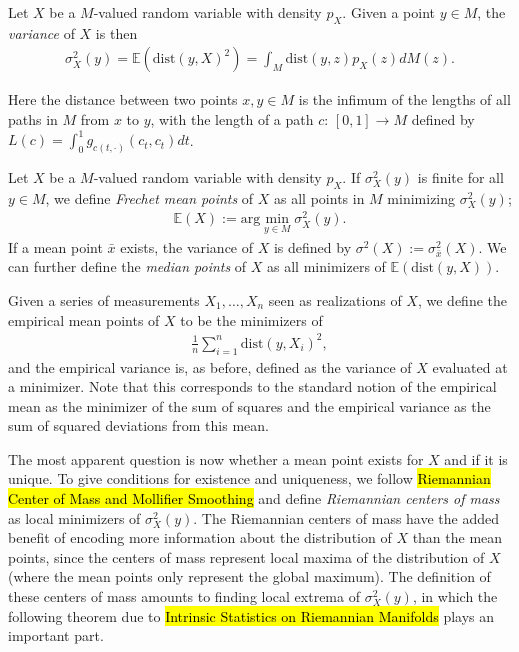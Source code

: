 \begin{definition}
Let $X$ be a $M$-valued random variable with density $p_X$. Given a point $y \in M$, the \textit{variance} of $X$ is then
\begin{align*}
\sigma^2_X (y) = \mathbb{E} ( \text{dist} (y,X)^2 ) = \int_M \text{dist} (y,z) p_X(z) dM(z).
\end{align*}
\end{definition}

Here the distance between two points $x,y \in M$ is the infimum of the lengths of all paths in $M$ from $x$ to $y$, with the length of a path $c: \, [0,1] \rightarrow M$ defined by $L(c) = \int_0^1 g_{c(t, \cdot)} (c_t, c_t) dt$.

\begin{definition}
Let $X$ be a $M$-valued random variable with density $p_X$. If $\sigma^2_X (y)$ is finite for all $y \in M$, we define \textit{Frechet mean points} of $X$ as all points in $M$ minimizing $\sigma^2_X (y)$;
\begin{align*}
\mathbb{E} (X) := \text{arg} \min_{y \in M} \sigma^2_X (y).
\end{align*}
If a mean point $\bar{x}$ exists, the variance of $X$ is defined by $\sigma^2 (X) := \sigma^2_{\bar{x}} (X)$. We can further define the \textit{median points} of $X$ as all minimizers of $\mathbb{E} ( \text{dist} (y,X))$.
\end{definition}

\begin{note}
Given a series of measurements $X_1, \ldots , X_n$ seen as realizations of $X$, we define the empirical mean points of $X$ to be the minimizers of 
\begin{align*}
\frac{1}{n} \sum_{i = 1}^n \text{dist}(y, X_i)^2,
\end{align*}
and the empirical variance is, as before, defined as the variance of $X$ evaluated at a minimizer. Note that this corresponds to the standard notion of the empirical mean as the minimizer of the sum of squares and the empirical variance as the sum of squared deviations from this mean.
\end{note}

The most apparent question is now whether a mean point exists for $X$ and if it is unique. To give conditions for existence and uniqueness, we follow \hl{Riemannian Center of Mass and Mollifier Smoothing} and define \textit{Riemannian centers of mass} as local minimizers of $\sigma_X^2 (y)$. The Riemannian centers of mass have the added benefit of encoding more information about the distribution of $X$ than the mean points, since the centers of mass represent local maxima of the distribution of $X$ (where the mean points only represent the global maximum). The definition of these centers of mass amounts to finding local extrema of $\sigma_X^2 (y)$, in which the following theorem due to \hl{Intrinsic Statistics on Riemannian Manifolds} plays an important part.

